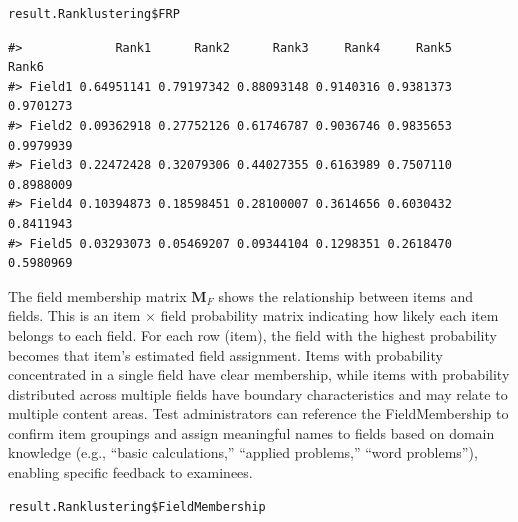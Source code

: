 \begin{verbatim}
result.Ranklustering$FRP
\end{verbatim}

\begin{verbatim}
#>             Rank1      Rank2      Rank3     Rank4     Rank5     Rank6
#> Field1 0.64951141 0.79197342 0.88093148 0.9140316 0.9381373 0.9701273
#> Field2 0.09362918 0.27752126 0.61746787 0.9036746 0.9835653 0.9979939
#> Field3 0.22472428 0.32079306 0.44027355 0.6163989 0.7507110 0.8988009
#> Field4 0.10394873 0.18598451 0.28100007 0.3614656 0.6030432 0.8411943
#> Field5 0.03293073 0.05469207 0.09344104 0.1298351 0.2618470 0.5980969
\end{verbatim}

The field membership matrix \(\mathbf{M}_F\) shows the relationship between items and fields. This is an item \(\times\) field probability matrix indicating how likely each item belongs to each field. For each row (item), the field with the highest probability becomes that item's estimated field assignment. Items with probability concentrated in a single field have clear membership, while items with probability distributed across multiple fields have boundary characteristics and may relate to multiple content areas. Test administrators can reference the FieldMembership to confirm item groupings and assign meaningful names to fields based on domain knowledge (e.g., ``basic calculations,'' ``applied problems,'' ``word problems''), enabling specific feedback to examinees.

\begin{verbatim}
result.Ranklustering$FieldMembership
\end{verbatim}


